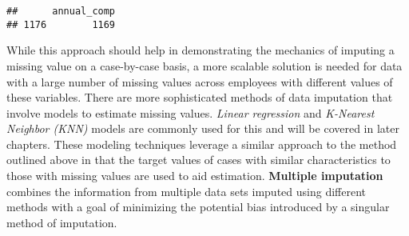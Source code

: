 \documentclass[
]{book}
\newenvironment{Shaded}{\begin{snugshade}}{\end{snugshade}}
\newcommand{\AttributeTok}[1]{\textcolor[rgb]{0.77,0.63,0.00}{#1}}
\newcommand{\CommentTok}[1]{\textcolor[rgb]{0.56,0.35,0.01}{\textit{#1}}}
\newcommand{\ConstantTok}[1]{\textcolor[rgb]{0.00,0.00,0.00}{#1}}
\newcommand{\DecValTok}[1]{\textcolor[rgb]{0.00,0.00,0.81}{#1}}
\newcommand{\FunctionTok}[1]{\textcolor[rgb]{0.00,0.00,0.00}{#1}}
\newcommand{\NormalTok}[1]{#1}
\newcommand{\OtherTok}[1]{\textcolor[rgb]{0.56,0.35,0.01}{#1}}
\newcommand{\SpecialCharTok}[1]{\textcolor[rgb]{0.00,0.00,0.00}{#1}}
\newcommand{\StringTok}[1]{\textcolor[rgb]{0.31,0.60,0.02}{#1}}
\begin{document}
\begin{Shaded}
\end{Shaded}

\begin{verbatim}
##      annual_comp
## 1176        1169
\end{verbatim}

While this approach should help in demonstrating the mechanics of imputing a missing value on a case-by-case basis, a more scalable solution is needed for data with a large number of missing values across employees with different values of these variables. There are more sophisticated methods of data imputation that involve models to estimate missing values. \emph{Linear regression} and \emph{K-Nearest Neighbor (KNN)} models are commonly used for this and will be covered in later chapters. These modeling techniques leverage a similar approach to the method outlined above in that the target values of cases with similar characteristics to those with missing values are used to aid estimation. \textbf{Multiple imputation} combines the information from multiple data sets imputed using different methods with a goal of minimizing the potential bias introduced by a singular method of imputation.
\end{document}
